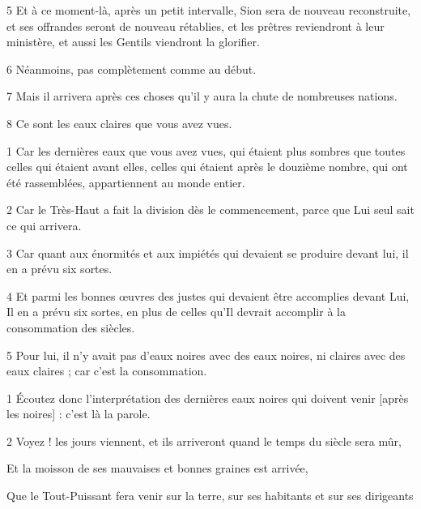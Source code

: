 \par 5 Et à ce moment-là, après un petit intervalle, Sion sera de nouveau reconstruite, et ses offrandes seront de nouveau rétablies, et les prêtres reviendront à leur ministère, et aussi les Gentils viendront la glorifier.

\par 6 Néanmoins, pas complètement comme au début.

\par 7 Mais il arrivera après ces choses qu'il y aura la chute de nombreuses nations.

\par 8 Ce sont les eaux claires que vous avez vues.


\par 1 Car les dernières eaux que vous avez vues, qui étaient plus sombres que toutes celles qui étaient avant elles, celles qui étaient après le douzième nombre, qui ont été rassemblées, appartiennent au monde entier.

\par 2 Car le Très-Haut a fait la division dès le commencement, parce que Lui seul sait ce qui arrivera.

\par 3 Car quant aux énormités et aux impiétés qui devaient se produire devant lui, il en a prévu six sortes.

\par 4 Et parmi les bonnes œuvres des justes qui devaient être accomplies devant Lui, Il en a prévu six sortes, en plus de celles qu'Il devrait accomplir à la consommation des siècles.

\par 5 Pour lui, il n'y avait pas d'eaux noires avec des eaux noires, ni claires avec des eaux claires ; car c'est la consommation.


\par 1 Écoutez donc l'interprétation des dernières eaux noires qui doivent venir [après les noires] : c'est là la parole.

\par 2 Voyez ! les jours viennent, et ils arriveront quand le temps du siècle sera mûr,

\par Et la moisson de ses mauvaises et bonnes graines est arrivée,

\par Que le Tout-Puissant fera venir sur la terre, sur ses habitants et sur ses dirigeants

